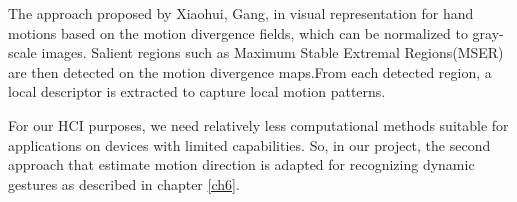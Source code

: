 The approach proposed by Xiaohui, Gang, in \cite{dynamic2} visual representation for hand motions based on the motion divergence fields, which can be normalized to gray-scale images. Salient regions such as Maximum Stable Extremal Regions(MSER) are then detected on the motion divergence maps.From each detected region, a local descriptor is extracted to capture local motion patterns.
\bigskip

 For our HCI purposes, we need relatively less computational methods suitable for applications on devices with limited capabilities. So, in our project, the second approach that estimate motion direction\cite{dynamic2} is adapted for recognizing dynamic gestures as described in chapter \ref{ch6}.
 
 